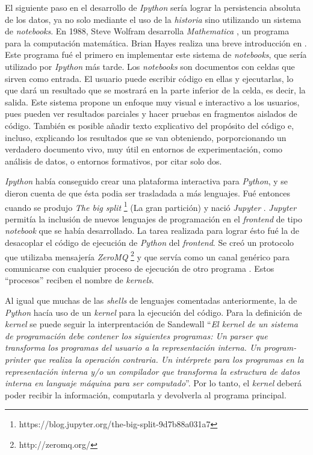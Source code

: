 \documentclass[11pt,spanish,listoffigures]{tfgetsinf}
\begin{document}
El siguiente paso en el desarrollo de \textit{Ipython} sería lograr la persistencia absoluta de los datos, ya no solo mediante el uso de la \textit{historia} sino utilizando un sistema de \textit{notebooks}. En 1988, Steve Wolfram desarrolla \textit{Mathematica} \cite{math}, un programa para la computación matemática. Brian Hayes realiza una breve introducción en \cite{th-mathematica}. Este programa fué el primero en implementar este sistema de \textit{notebooks}, que sería utilizado por \textit{Ipython} más tarde. Los \textit{notebooks} son documentos con celdas que sirven como entrada. El usuario puede escribir código en ellas y ejecutarlas, lo que dará un resultado que se mostrará en la parte inferior de la celda, es decir, la salida. Este sistema propone un enfoque muy visual e interactivo a los usuarios, pues pueden ver resultados parciales y hacer pruebas en fragmentos aislados de código. También es posible añadir texto explicativo del propósito del código e, incluso, explicando los resultados que se van obteniendo, porporcionando un verdadero documento vivo, muy útil en entornos de experimentación, como análisis de datos, o entornos formativos, por citar solo dos.

\textit{Ipython} había conseguido crear una plataforma interactiva para \textit{Python}, y se dieron cuenta de que ésta podia ser trasladada a más lenguajes. Fué entonces cuando se produjo\textit{ The big split} \footnote{https://blog.jupyter.org/the-big-split-9d7b88a031a7} (La gran partición) y nació \textit{Jupyter} \cite{jupyter-nb}. \textit{Jupyter} permitía la inclusión de nuevos lenguajes de programación en el \textit{frontend} de tipo \textit{notebook} que se había desarrollado. La tarea realizada para lograr ésto fué la de desacoplar el código de ejecución de \textit{Python} del \textit{frontend}. Se creó un protocolo que utilizaba mensajería \textit{ZeroMQ} \footnote{http://zeromq.org/} y que servía como un canal genérico para comunicarse con cualquier proceso de ejecución de otro programa \cite{wire-protocol}. Estos ``procesos'' reciben el nombre de \textit{kernels}.

Al igual que muchas de las \textit{shells} de lenguajes comentadas anteriormente, la de \textit{Python} hacía uso de un \textit{kernel} para la ejecución del código. Para la definición de \textit{kernel} se puede seguir la interprentación de Sandewall ``\textit{El kernel de un sistema de programación debe contener los siguientes programas: Un parser que transforma los programas del usuario a la representación interna. Un program-printer que realiza la operación contraria. Un intérprete para los programas en la representación interna y/o un compilador que transforma la estructura de datos interna en languaje máquina para ser computado}''\cite{Sandewall}. Por lo tanto, el \textit{kernel} deberá poder recibir la información, computarla y devolverla al programa principal.
\end{document}
